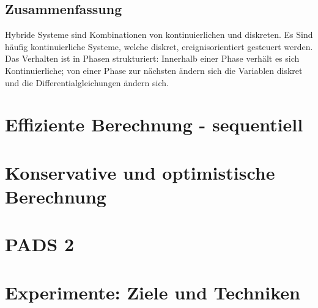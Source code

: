 \documentclass[11pt, fleqn, a4paper, leqno]{scrartcl} %
\begin{document}
			\subsection{Zusammenfassung}
				Hybride Systeme sind Kombinationen von kontinuierlichen und diskreten. Es Sind häufig kontinuierliche Systeme, welche diskret, ereignisorientiert gesteuert werden.\\
				Das Verhalten ist in Phasen strukturiert: Innerhalb einer Phase verhält  es sich Kontinuierliche; von einer Phase zur nächsten ändern sich die Variablen diskret und die Differentialgleichungen ändern sich.
	\section{Effiziente Berechnung - sequentiell}

	\section{Konservative und optimistische Berechnung}

	\section{PADS 2}

	\section{Experimente: Ziele und Techniken}
\end{document}
